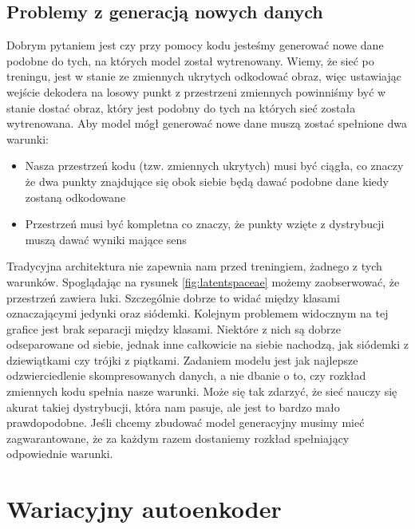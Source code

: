 \documentclass[a4paper,12pt]{book} %
\begin{document}
\section{Problemy z generacją nowych danych}
Dobrym pytaniem jest czy przy pomocy kodu jesteśmy generować nowe dane podobne do tych, na których model został wytrenowany. Wiemy, że sieć po treningu, jest w stanie ze zmiennych ukrytych odkodować obraz, więc ustawiając wejście dekodera na losowy punkt z przestrzeni zmiennych powinniśmy być w stanie dostać obraz, który jest podobny do tych na których sieć została wytrenowana.
Aby model mógł generować nowe dane muszą zostać spełnione dwa warunki:
\begin{itemize}
	\item Nasza przestrzeń kodu (tzw. zmiennych ukrytych) musi być ciągła, co znaczy że dwa punkty znajdujące się obok siebie będą dawać podobne dane kiedy zostaną odkodowane
	\item Przestrzeń musi być kompletna co znaczy, że punkty wzięte z dystrybucji muszą dawać wyniki mające sens
\end{itemize}
Tradycyjna architektura nie zapewnia nam przed treningiem, żadnego z tych warunków.
Spoglądając na rysunek \ref{fig:latentspaceae} możemy zaobserwować, że przestrzeń zawiera luki. Szczególnie dobrze to widać między klasami oznaczającymi jedynki oraz siódemki. Kolejnym problemem widocznym na tej grafice jest brak separacji między klasami. Niektóre z nich są dobrze odseparowane od siebie, jednak inne całkowicie na siebie nachodzą, jak siódemki z dziewiątkami czy trójki z piątkami. Zadaniem modelu jest jak najlepsze odzwierciedlenie skompresowanych danych, a nie dbanie o to, czy rozkład zmiennych kodu spełnia nasze warunki. Może się tak zdarzyć, że sieć nauczy się akurat takiej dystrybucji, która nam pasuje, ale jest to bardzo mało prawdopodobne. Jeśli chcemy zbudować model generacyjny musimy mieć zagwarantowane, że za każdym razem dostaniemy rozkład spełniający odpowiednie warunki. 
\chapter{Wariacyjny autoenkoder}
\end{document}
